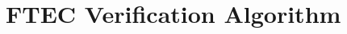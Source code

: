 \documentclass[acmsmall,screen,review,anonymous,nonacm]{acmart}
\begin{document}

        
        






\section{FTEC Verification Algorithm}
\label{sec:FTEC-verification}
\end{document}
